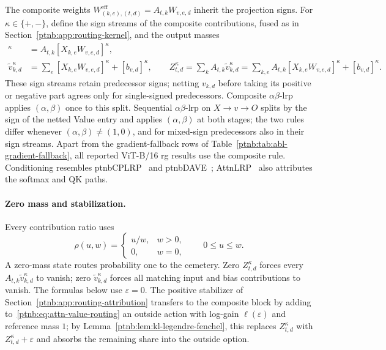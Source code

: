 The composite weights $W^{\mathrm{eff}}_{(k,e),(t,d)}=A_{t,k}W_{v,e,d}$ inherit the projection signs. For $\kappa\in\{+,-\}$, define the sign streams of the composite contributions, fused as in Section~\ref{ptnb:app:routing-kernel}, and the output masses
\begin{align}
    [W^{\mathrm{eff}}_{(k,e),(t,d)}X_{k,e}]^\kappa
      &=A_{t,k}[X_{k,e}W_{v,e,d}]^\kappa,\label{ptnb:eq:attn-composite-weight}\\
    \tilde v_{k,d}^\kappa&=\sum_e[X_{k,e}W_{v,e,d}]^\kappa+[b_{v,d}]^\kappa,
    \qquad
    Z_{t,d}^\kappa=\sum_k A_{t,k}\tilde v_{k,d}^\kappa
      =\sum_{k,e}A_{t,k}[X_{k,e}W_{v,e,d}]^\kappa+[b_{v,d}]^\kappa.
      \label{ptnb:eq:attn-Z-def}
\end{align}
These sign streams retain predecessor signs; netting $v_{k,d}$ before taking its positive or negative part agrees only for single-signed predecessors. Composite $\alpha\beta$-\ac{lrp} applies $(\alpha,\beta)$ once to this split. Sequential $\alpha\beta$-\ac{lrp} on $X\to v\to O$ splits by the sign of the netted Value entry and applies $(\alpha,\beta)$ at both stages; the two rules differ whenever $(\alpha,\beta)\neq(1,0)$, and for mixed-sign predecessors also in their sign streams. Apart from the gradient-fallback rows of Table~\ref{ptnb:tab:abl-gradient-fallback}, all reported ViT-B/16 \ac{rg} results use the composite rule. Conditioning resembles \ac{ptnbCPLRP}~\parencite{Ali2022AttnLRP} and \ac{ptnbDAVE}~\parencite{Wrobel2024}; AttnLRP~\parencite{Achtibat2024AttnLRP} also attributes the softmax and QK paths.

\paragraph{Zero mass and stabilization.}
Every contribution ratio uses
\begin{equation}\label{ptnb:eq:attn-zero-ratio}
    \rho(u,w)=\begin{cases}u/w,&w>0,\\0,&w=0,\end{cases}
    \qquad 0\le u\le w.
\end{equation}
A zero-mass state routes probability one to the cemetery. Zero $Z_{t,d}^\kappa$ forces every $A_{t,k}\tilde v_{k,d}^\kappa$ to vanish; zero $\tilde v_{k,d}^\kappa$ forces all matching input and bias contributions to vanish. The formulas below use $\varepsilon=0$. The positive stabilizer of Section~\ref{ptnb:app:routing-attribution} transfers to the composite block by adding to~\eqref{ptnb:eq:attn-value-routing} an outside action with log-gain $\ell(\varepsilon)$ and reference mass $1$; by Lemma~\ref{ptnb:lem:kl-legendre-fenchel}, this replaces $Z_{t,d}^\kappa$ with $Z_{t,d}^\kappa+\varepsilon$ and absorbs the remaining share into the outside option.

